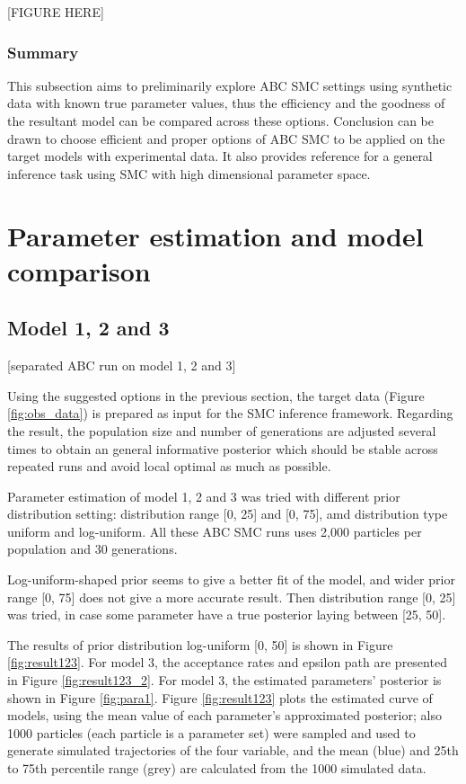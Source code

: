 [FIGURE HERE]


\subsubsection{Summary} This subsection aims to preliminarily explore ABC SMC settings using synthetic data with known true parameter values, thus the efficiency and the goodness of the resultant model can be compared across these options. Conclusion can be drawn to choose efficient and proper options of ABC SMC to be applied on the target models with experimental data. It also provides reference for a general inference task using SMC with high dimensional parameter space.








\section{Parameter estimation and model comparison}

\subsection{Model 1, 2 and 3}

[separated ABC run on model 1, 2 and 3]

Using the suggested options in the previous section, the target data (Figure \ref{fig:obs_data}) is prepared as input for the SMC inference framework. Regarding the result, the population size and number of generations are adjusted several times to obtain an general informative posterior which should be stable across repeated runs and avoid local optimal as much as possible.

Parameter estimation of model 1, 2 and 3 was tried with different prior distribution setting: distribution range [0, 25] and [0, 75], amd distribution type uniform and log-uniform. All these ABC SMC runs uses 2,000 particles per population and 30 generations.

Log-uniform-shaped prior seems to give a better fit of the model, and wider prior range [0, 75] does not give a more accurate result. Then distribution range [0, 25] was tried, in case some parameter have a true posterior laying between [25, 50].

The results of prior distribution log-uniform [0, 50] is shown in Figure \ref{fig:result123}. For model 3, the acceptance rates and epsilon path are presented in Figure \ref{fig:result123_2}. For model 3, the estimated parameters' posterior is shown in Figure \ref{fig:para1}. Figure \ref{fig:result123} plots the estimated curve of models, using the mean value of each parameter's approximated posterior; also 1000 particles (each particle is a parameter set) were sampled and used to generate simulated trajectories of the four variable, and the mean (blue) and 25th to 75th percentile range (grey) are calculated from the 1000 simulated data.

